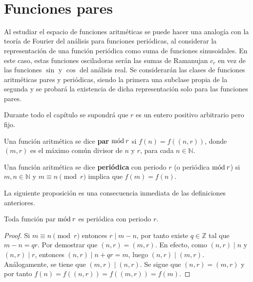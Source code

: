 \newpage
\thispagestyle{empty}
\
\newpage
\section{Funciones pares}

Al estudiar el espacio de funciones aritméticas se puede hacer una analogía con la teoría de Fourier del análisis para funciones periódicas, al considerar la representación de una función periódica como suma de funciones sinusoidales. En este caso, estas funciones osciladoras serán las sumas de Ramanujan $c_r$ en vez de las funciones $\sin$ y $\cos$ del análisis real. Se considerarán las clases de funciones aritméticas pares y periódicas, siendo la primera una subclase propia de la segunda y se probará la existencia de dicha representación solo para las funciones pares.

\begin{remark}
Durante todo el capítulo se supondrá que $r$ es un entero positivo arbitrario pero fijo.
\end{remark}

\begin{definition}\label{def:even}
Una función aritmética se dice \textbf{par} $\mathrm{m\acute{o}d\:}r$ si $f(n)=f((n,r))$, donde $(m,r)$ es el máximo común divisor de $n$ y $r$, para cada $n \in \mathbb{N}$.
\end{definition}

\begin{definition}
Una función aritmética se dice \textbf{periódica} con periodo $r$ (o periódica $\mathrm{m\acute{o}d\:}r$) si $m, n \in \mathbb{N}$ y $m \equiv n \pmod{r}$ implica que $f(m)=f(n)$.
\end{definition}

La siguiente proposición es una consecuencia inmediata de las definiciones anteriores.

\begin{proposition}\label{prop:mod->per}
Toda función par $\mathrm{m\acute{o}d\:}r$ es periódica con periodo $r$.
\end{proposition}
\begin{proof}
Si $m \equiv n \pmod{r}$ entonces $r \mid m-n$, por tanto existe $q \in \mathbb{Z}$ tal que $m-n=q r$. Por demostrar que $(n,r)=(m,r)$. En efecto, como $(n,r) \mid n$ y $(n,r) \mid r$, entonces $(n,r) \mid n+qr=m$, luego $(n,r) \mid (m,r)$. Análogamente, se tiene que $(m,r) \mid (n,r)$. Se sigue que $(n,r)=(m,r)$ y por tanto $f(n)=f((n,r))=f((m,r))=f(m)$.
\end{proof}

